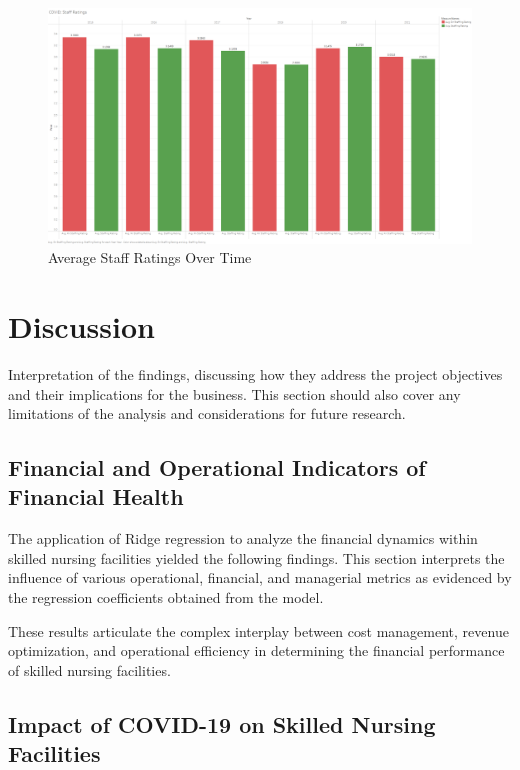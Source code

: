 \documentclass{article}
\theoremstyle{mytheoremstyle}
\theoremstyle{mytheoremstyle}
\theoremstyle{myproblemstyle}
\begin{document}
\begin{figure}[htbp]
\centering
\includegraphics[width=\linewidth]{Images/COVID Staff Ratings.png}
\caption{Average Staff Ratings Over Time}
\label{fig:Robust Scaler Results}
\end{figure}


\pagebreak



\section{Discussion}
Interpretation of the findings, discussing how they address the project objectives and their implications for the business. This section should also cover any limitations of the analysis and considerations for future research.

\subsection{Financial and Operational Indicators of Financial Health}
The application of Ridge regression to analyze the financial dynamics within skilled nursing facilities yielded the following findings. This section interprets the influence of various operational, financial, and managerial metrics as evidenced by the regression coefficients obtained from the model.


These results articulate the complex interplay between cost management, revenue optimization, and operational efficiency in determining the financial performance of skilled nursing facilities. 

\subsection{Impact of COVID-19 on Skilled Nursing Facilities}
\end{document}
